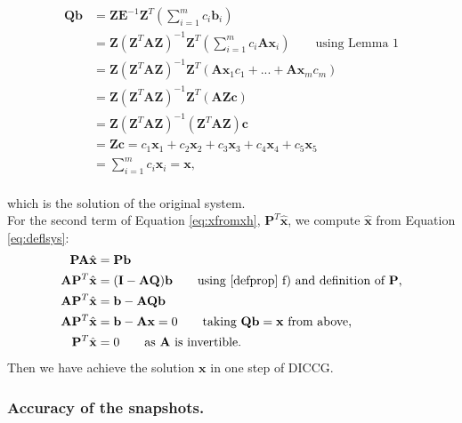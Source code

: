 \documentclass[12pt]{article}
\begin{document}
\begin{align*}
\mathbf{Q}\mathbf{b}&=\mathbf{Z}\mathbf{E}^{-1}\mathbf{Z}^T\left(\sum_{i=1}^m {c}_i\mathbf{b}_i\right)\\
&=\mathbf{Z}(\mathbf{Z}^T\mathbf{A}\mathbf{Z})^{-1}\mathbf{Z}^T\left(\sum_{i=1}^m {c}_i\mathbf{A}\mathbf{x}_i\right)\qquad \text{using Lemma 1}\\
&=\mathbf{Z}(\mathbf{Z}^T\mathbf{A}\mathbf{Z})^{-1}\mathbf{Z}^T\left( \mathbf{A}\mathbf{x}_1{c}_1+...+\mathbf{A}\mathbf{x}_m{c}_m\right) \\
&=\mathbf{Z}(\mathbf{Z}^T\mathbf{A}\mathbf{Z})^{-1}\mathbf{Z}^T(\mathbf{A}\mathbf{Z}\mathbf{c})  \\
&=\mathbf{Z}(\mathbf{Z}^T\mathbf{A}\mathbf{Z})^{-1}(\mathbf{Z}^T\mathbf{A}\mathbf{Z})\mathbf{c} \\
&=\mathbf{Z}\mathbf{c}= c_1\mathbf{x}_1+c_2\mathbf{x}_2+c_3\mathbf{x}_3+c_4\mathbf{x}_4+c_5\mathbf{x}_5\\
& =\sum_{i=1}^m {c}_i\mathbf{x}_i=\mathbf{x},
\end{align*}
\\
which is the solution of the original system.\\ 
For the second term of Equation \eqref{eq:xfromxh}, $\mathbf{P}^T\mathbf{\hat{x}}$, we compute $\mathbf{\hat{x}}$ from Equation \eqref{eq:deflsys}:
\begin{align*}
    \mathbf{P}\mathbf{A}\hat{\mathbf{x}}&=\mathbf{P}\mathbf{b}\\
    \mathbf{A}\mathbf{P}^T\hat{\mathbf{x}}&=(\mathbf{I}-\mathbf{A}\mathbf{Q})\mathbf{b} \qquad \text{using \ref{defprop} f) and definition of $\mathbf{P}$,}\\
        \mathbf{A}\mathbf{P}^T\hat{\mathbf{x}}&=\mathbf{b}-\mathbf{A}\mathbf{Q}\mathbf{b}\\
        \mathbf{A}\mathbf{P}^T\hat{\mathbf{x}}&=\mathbf{b}-\mathbf{A}\mathbf{x}=0 \qquad \text{taking $\mathbf{Q}\mathbf{b}=\mathbf{x}$ from above,}\\
          \mathbf{P}^T\hat{\mathbf{x}}&=0 \qquad \text{as $\mathbf{A}$ is invertible.}
\end{align*}
Then we have achieve the solution $\mathbf{x}$ in one step of DICCG.\\


\subsubsection{Accuracy of the snapshots.}\label{accs}
\end{document}
